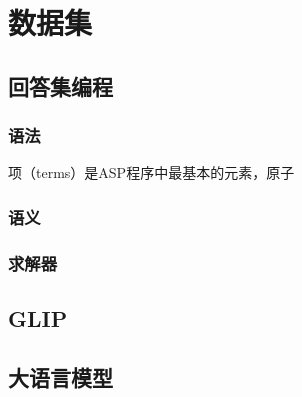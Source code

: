 \chapter{数据集}
\section{回答集编程}
\subsection{语法}
项（terms）是ASP程序中最基本的元素，原子
\subsection{语义}
\subsection{求解器}
\section{GLIP}
\section{大语言模型}
